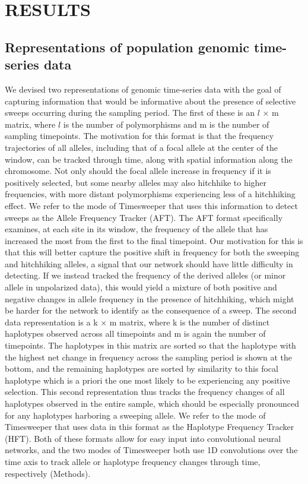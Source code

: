 \newpage
\section{RESULTS}
\subsection{Representations of population genomic time-series data}

We devised two representations of genomic time-series data with the goal of capturing information that would be informative about the presence of selective sweeps occurring during the sampling period. The first of these is an $l$ × m matrix, where $l$ is the number of polymorphisms and m is the number of sampling timepoints. The motivation for this format is that the frequency trajectories of all alleles, including that of a focal allele at the center of the window, can be tracked through time, along with spatial information along the chromosome. Not only should the focal allele increase in frequency if it is positively selected, but some nearby alleles may also hitchhike to higher frequencies, with more distant polymorphisms experiencing less of a hitchhiking effect. We refer to the mode of Timesweeper that uses this information to detect sweeps as the Allele Frequency Tracker (AFT). The AFT format specifically examines, at each site in its window, the frequency of the allele that has increased the most from the first to the final timepoint. Our motivation for this is that this will better capture the positive shift in frequency for both the sweeping and hitchhiking alleles, a signal that our network should have little difficulty in detecting. If we instead tracked the frequency of the derived alleles (or minor allele in unpolarized data), this would yield a mixture of both positive and negative changes in allele frequency in the presence of hitchhiking, which might be harder for the network to identify as the consequence of a sweep. 
The second data representation is a k × m matrix, where k is the number of distinct haplotypes observed across all timepoints and m is again the number of timepoints. The haplotypes in this matrix are sorted so that the haplotype with the highest net change in frequency across the sampling period is shown at the bottom, and the remaining haplotypes are sorted by similarity to this focal haplotype which is a priori the one most likely to be experiencing any positive selection. This second representation thus tracks the frequency changes of all haplotypes observed in the entire sample, which should be especially pronounced for any haplotypes harboring a sweeping allele. We refer to the mode of Timesweeper that uses data in this format as the Haplotype Frequency Tracker (HFT). Both of these formats allow for easy input into convolutional neural networks, and the two modes of Timesweeper both use 1D convolutions over the time axis to track allele or haplotype frequency changes through time, respectively (Methods).
